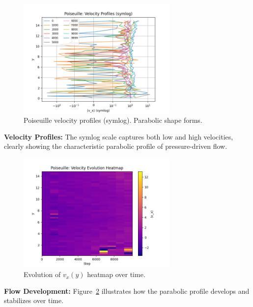\documentclass[11pt,a4paper]{article}
\begin{document}
\begin{figure}[H]
  \centering
  \includegraphics[width=0.7\textwidth]{figures/poiseuille/vprof_symlog.png}
  \caption{Poiseuille velocity profiles (symlog). Parabolic shape forms.}
  \label{fig:pois_vprof}
\end{figure}
\noindent \textbf{Velocity Profiles:} The symlog scale captures both low and high velocities, clearly showing the characteristic parabolic profile of pressure-driven flow.

\begin{figure}[H]
  \centering
  \includegraphics[width=0.7\textwidth]{figures/poiseuille/vprof_heatmap.png}
  \caption{Evolution of $v_x(y)$ heatmap over time.}
  \label{fig:pois_heat}
\end{figure}
\noindent \textbf{Flow Development:} Figure~\ref{fig:pois_heat} illustrates how the parabolic profile develops and stabilizes over time.
\end{document}
